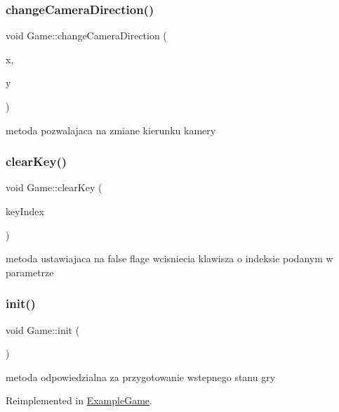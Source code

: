 \subsubsection{\texorpdfstring{change\+Camera\+Direction()}{changeCameraDirection()}}
{\footnotesize\ttfamily void Game\+::change\+Camera\+Direction (\begin{DoxyParamCaption}\item[{G\+Lfloat}]{x,  }\item[{G\+Lfloat}]{y }\end{DoxyParamCaption})}



metoda pozwalajaca na zmiane kierunku kamery 

\mbox{\label{class_game_a90758cbf907d59c91ee811c45f70b654}} 
\subsubsection{\texorpdfstring{clear\+Key()}{clearKey()}}
{\footnotesize\ttfamily void Game\+::clear\+Key (\begin{DoxyParamCaption}\item[{int}]{key\+Index }\end{DoxyParamCaption})}



metoda ustawiajaca na false flage wcisniecia klawisza o indeksie podanym w parametrze 

\mbox{\label{class_game_a6f3a33940524b6ba9d83f627ccb14bbf}} 
\subsubsection{\texorpdfstring{init()}{init()}}
{\footnotesize\ttfamily void Game\+::init (\begin{DoxyParamCaption}{ }\end{DoxyParamCaption})\hspace{0.3cm}{\ttfamily [virtual]}}



metoda odpowiedzialna za przygotowanie wstepnego stanu gry 



Reimplemented in \hyperlink{class_example_game_ab7b84dad80cbf4eefd562f0c8e6495ab}{Example\+Game}.

